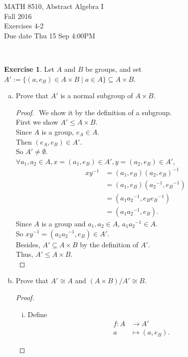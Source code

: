 \documentclass{amsart}
\theoremstyle{plain}
\theoremstyle{definition}
\newtheorem{exer}[lem]{Exercise}
\begin{document}
\noindent MATH 8510, Abstract Algebra I \\
Fall 2016\\
Exercises 4-2\\
Due date Thu 15 Sep 4:00PM

\

%
%


\begin{exer}
Let $A$ and $B$ be groups, and set $A':=\{(a,e_B)\in A\times B\mid a\in A\}\subseteq A\times B$.
\begin{enumerate}[(a)]
\item 
Prove that $A'$ is a normal subgroup of $A\times B$.
\begin{proof}
	$ $\newline
	We show it by the definition of a subgroup.\\
	First we show $A' \leq A \times B$.\\
	Since $A$ is a group, $e_A \in A$.\\
	Then $(e_A,e_B) \in A'$.\\
	So $A' \neq \emptyset$.\\
	$\forall a_1,a_2 \in A, x = (a_1, e_B) \in A',y =  (a_2,e_B) \in A'$,
	\begin{align*}
		xy^{-1} &= (a_1, e_B)(a_2,e_B)^{-1} \\
					  &= (a_1, e_B)({a_2}^{-1},{e_B}^{-1}) \\
					  &= (a_1{a_2}^{-1},e_B{e_B}^{-1}) \\
					  &= (a_1{a_2}^{-1},e_B).
	\end{align*}
	Since $A$ is a group and $a_1,a_2 \in A$, $a_1{a_2}^{-1} \in A$.\\
	So $xy^{-1} = (a_1{a_2}^{-1},e_B) \in A'$.\\
	Besides, $A' \subseteq A\times B$ by the definition of $A'$.\\
	Thus, $A' \leq A \times B$.\\
\end{proof}
\item Prove that $A'\cong A$ and $(A\times B)/A'\cong B$.
	\begin{proof}
		$ $\newline
		\begin{enumerate}[(i)]
		\item
			Define
				\begin{align*}
					f: A& \to A' \\
					a& \mapsto (a,e_B).
				\end{align*}

\end{enumerate}
\end{proof}
\end{enumerate}
\end{exer}
\end{document}
